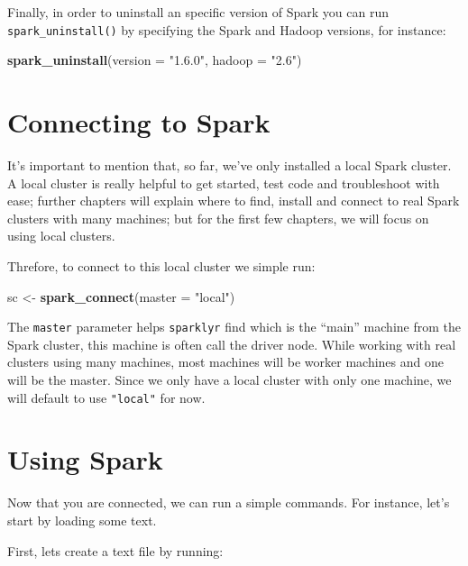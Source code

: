 \documentclass[]{book}
\newenvironment{Shaded}{\begin{snugshade}}{\end{snugshade}}
\newcommand{\KeywordTok}[1]{\textcolor[rgb]{0.13,0.29,0.53}{\textbf{#1}}}
\newcommand{\DataTypeTok}[1]{\textcolor[rgb]{0.13,0.29,0.53}{#1}}
\newcommand{\StringTok}[1]{\textcolor[rgb]{0.31,0.60,0.02}{#1}}
\newcommand{\NormalTok}[1]{#1}
\theoremstyle{definition}
\theoremstyle{definition}
\theoremstyle{definition}
\theoremstyle{remark}
\begin{document}
Finally, in order to uninstall an specific version of Spark you can run
\texttt{spark\_uninstall()} by specifying the Spark and Hadoop versions,
for instance:

\begin{Shaded}
\begin{Highlighting}[]
\KeywordTok{spark_uninstall}\NormalTok{(}\DataTypeTok{version =} \StringTok{"1.6.0"}\NormalTok{, }\DataTypeTok{hadoop =} \StringTok{"2.6"}\NormalTok{)}
\end{Highlighting}
\end{Shaded}

\section{Connecting to Spark}\label{connecting-to-spark}

It's important to mention that, so far, we've only installed a local
Spark cluster. A local cluster is really helpful to get started, test
code and troubleshoot with ease; further chapters will explain where to
find, install and connect to real Spark clusters with many machines; but
for the first few chapters, we will focus on using local clusters.

Threfore, to connect to this local cluster we simple run:

\begin{Shaded}
\begin{Highlighting}[]
\NormalTok{sc <-}\StringTok{ }\KeywordTok{spark_connect}\NormalTok{(}\DataTypeTok{master =} \StringTok{"local"}\NormalTok{)}
\end{Highlighting}
\end{Shaded}

The \texttt{master} parameter helps \texttt{sparklyr} find which is the
``main'' machine from the Spark cluster, this machine is often call the
driver node. While working with real clusters using many machines, most
machines will be worker machines and one will be the master. Since we
only have a local cluster with only one machine, we will default to use
\texttt{"local"} for now.

\section{Using Spark}\label{using-spark}

Now that you are connected, we can run a simple commands. For instance,
let's start by loading some text.

First, lets create a text file by running:
\end{document}
